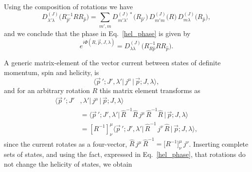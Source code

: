 \documentclass[twocolumn,amsmath,amssymb,prd,10pt,floatfix, 
superscriptaddress,nofootinbib, showpacs, preprintnumbers]{revtex4-1}
\begin{document}
Using the composition of rotations we have
\begin{equation*}
D^{(J)}_{\lambda'\lambda}\big(R^{-1}_{\hat{p}'} R R_{\hat{p}} \big) = \sum_{m',m} D^{(J)*}_{m' \lambda'}\big(R_{\hat{p}'}\big)\,   D^{(J)}_{m' m}\big(R\big)  \, D^{(J)}_{m\lambda}\big(R_{\hat{p}} \big), 
\end{equation*}
and we conclude that the phase in Eq.~\ref{hel_phase} is given by
\begin{equation}
e^{i \Phi(R, \vec{p}, J, \lambda)} = D^{(J)}_{\lambda\lambda}\big(R^{-1}_{R\hat{p}} R  R_{\hat{p}} \big). \label{hel_phase_D}
\end{equation}

A generic matrix-element of the vector current between states of definite momentum, spin and helicity, is
\begin{equation*}
\big\langle \vec{p}\,'; J' ,\lambda'  \big| \, j^\mu\,  \big|\, \vec{p}; J, \lambda \big\rangle,
\end{equation*}
and for an arbitrary rotation $R$ this matrix element transforms as 
\begin{align*}
\big\langle \vec{p}\,'; J'& ,\lambda'  \big| \, j^\mu \, \big| \, \vec{p}; J, \lambda  \big\rangle  \\
 &= \big\langle \vec{p}\,'; J' ,\lambda' \big| \, \hat{R}^{-1}\hat{R} \, j^\mu \,  \hat{R}^{-1}\hat{R} \, \big| \, \vec{p}; J, \lambda  \big\rangle \\
&= \left[R^{-1}\right]^\mu_\nu    \big\langle \vec{p}\,'; J' ,\lambda'  \big|\,  \hat{R}^{-1} \, j^\nu\,  \hat{R} \, \big| \, \vec{p}; J, \lambda  \big\rangle,
\end{align*}
since the current rotates as a four-vector, ${\hat{R} \, j^\mu \, \hat{R}^{-1} = \big[ R^{-1} \big]^\mu_\nu \, j^\nu}$. Inserting complete sets of states, and using the fact, expressed in Eq.~\ref{hel_phase}, that rotations do not change the helicity of states, we obtain
\end{document}
